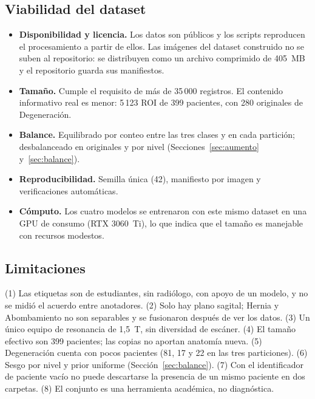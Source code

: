 \subsection{Viabilidad del dataset}
\begin{itemize}
  \item \textbf{Disponibilidad y licencia.} Los datos son públicos y los scripts reproducen el procesamiento a partir de ellos. Las imágenes del dataset construido no se suben al repositorio: se distribuyen como un archivo comprimido de 405~MB y el repositorio guarda sus manifiestos.
  \item \textbf{Tamaño.} Cumple el requisito de más de 35\,000 registros. El contenido informativo real es menor: 5\,123 ROI de 399 pacientes, con 280 originales de Degeneración.
  \item \textbf{Balance.} Equilibrado por conteo entre las tres clases y en cada partición; desbalanceado en originales y por nivel (Secciones~\ref{sec:aumento} y~\ref{sec:balance}).
  \item \textbf{Reproducibilidad.} Semilla única (42), manifiesto por imagen y verificaciones automáticas.
  \item \textbf{Cómputo.} Los cuatro modelos se entrenaron con este mismo dataset en una GPU de consumo (RTX 3060~Ti), lo que indica que el tamaño es manejable con recursos modestos.
\end{itemize}

\subsection{Limitaciones}
(1) Las etiquetas son de estudiantes, sin radiólogo, con apoyo de un modelo, y no se midió el acuerdo entre anotadores. (2) Solo hay plano sagital; Hernia y Abombamiento no son separables y se fusionaron después de ver los datos. (3) Un único equipo de resonancia de 1,5~T, sin diversidad de escáner. (4) El tamaño efectivo son 399 pacientes; las copias no aportan anatomía nueva. (5) Degeneración cuenta con pocos pacientes (81, 17 y 22 en las tres particiones). (6) Sesgo por nivel y prior uniforme (Sección~\ref{sec:balance}). (7) Con el identificador de paciente vacío no puede descartarse la presencia de un mismo paciente en dos carpetas. (8) El conjunto es una herramienta académica, no diagnóstica.
